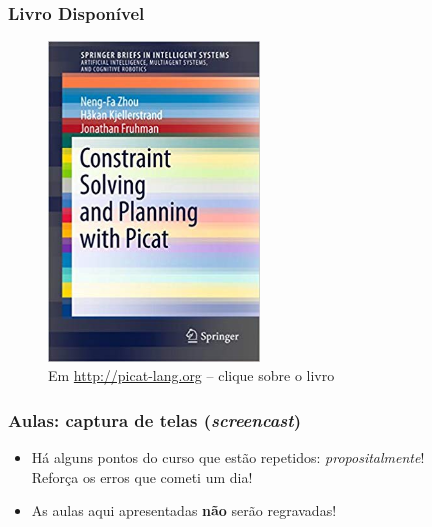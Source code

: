 \begin{frame}
\frametitle{Livro Disponível}

\begin{figure}[ht!]
\begin{center}
\includegraphics[width=0.5\textwidth, height=0.70\textheight]{figures/livro_picat.jpg}
\caption{Em \url{http://picat-lang.org} -- clique sobre o livro}
\end{center}
\end{figure}


\end{frame}





    
\begin{frame}[fragile]
  \frametitle{Aulas: captura de telas (\textit{screencast})}
  \begin{itemize}

    \item Há alguns pontos do curso que estão repetidos: \textit{propositalmente}!\\
    \pause
    Reforça os erros que cometi um dia!

    \pause
    \item As aulas aqui apresentadas \textbf{não} serão regravadas!
        
    
    
  \end{itemize}

\end{frame}

